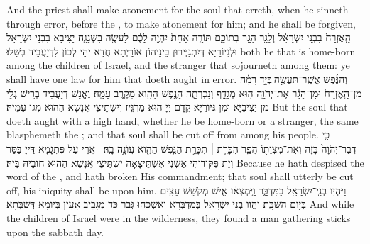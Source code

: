 {And the priest shall make atonement for the soul that erreth, when he sinneth through error, before the \lord, to make atonement for him; and he shall be forgiven,}{}
{הָֽאֶזְרָח֙ בִּבְנֵ֣י יִשְׂרָאֵ֔ל וְלַגֵּ֖ר הַגָּ֣ר בְּתוֹכָ֑ם תּוֹרָ֤ה אַחַת֙ יִהְיֶ֣ה לָכֶ֔ם לָעֹשֶׂ֖ה בִּשְׁגָגָֽה׃}
{יַצִּיבָא בִּבְנֵי יִשְׂרָאֵל וּלְגִיּוֹרַיָּא דְּיִתְגַּיְּירוּן בֵּינֵיהוֹן אוֹרָיְתָא חֲדָא יְהֵי לְכוֹן לִדְיַעֲבֵיד בְּשָׁלוּ׃}
{both he that is home-born among the children of Israel, and the stranger that sojourneth among them: ye shall have one law for him that doeth aught in error.}{}
{וְהַנֶּ֜פֶשׁ אֲשֶֽׁר־תַּעֲשֶׂ֣ה \legarmeh  בְּיָ֣ד רָמָ֗ה מִן־הָֽאֶזְרָח֙ וּמִן־הַגֵּ֔ר אֶת־יְהֹוָ֖ה ה֣וּא מְגַדֵּ֑ף וְנִכְרְתָ֛ה הַנֶּ֥פֶשׁ הַהִ֖וא מִקֶּ֥רֶב עַמָּֽהּ׃
}
{וֶאֱנָשׁ דְּיַעֲבֵיד בְּרֵישׁ גְּלֵי מִן יַצִּיבַיָּא וּמִן גִּיּוֹרַיָּא קֳדָם יְיָ הוּא מַרְגֵּיז וְיִשְׁתֵּיצֵי אֲנָשָׁא הַהוּא מִגּוֹ עַמֵּיהּ׃}
{But the soul that doeth aught with a high hand, whether he be home-born or a stranger, the same blasphemeth the \lord; and that soul shall be cut off from among his people.}{}
{כִּ֤י דְבַר־יְהֹוָה֙ בָּזָ֔ה וְאֶת־מִצְוָת֖וֹ הֵפַ֑ר הִכָּרֵ֧ת \small ׀\normalsize  תִּכָּרֵ֛ת הַנֶּ֥פֶשׁ הַהִ֖וא עֲוֺנָ֥ה בָֽהּ׃ \petucha 
{}}
{אֲרֵי עַל פִּתְגָמָא דַּייָ בַּסַּר וְיָת פִּקּוֹדוֹהִי אַשְׁנִי אִשְׁתֵּיצָאָה יִשְׁתֵּיצֵי אֲנָשָׁא הַהוּא חוֹבֵיהּ בֵּיהּ׃}
{Because he hath despised the word of the \lord, and hath broken His commandment; that soul shall utterly be cut off, his iniquity shall be upon him.}{}
{וַיִּהְי֥וּ בְנֵֽי־יִשְׂרָאֵ֖ל בַּמִּדְבָּ֑ר וַֽיִּמְצְא֗וּ אִ֛ישׁ מְקֹשֵׁ֥שׁ עֵצִ֖ים בְּי֥וֹם הַשַּׁבָּֽת׃
}
{וַהֲווֹ בְנֵי יִשְׂרָאֵל בְּמַדְבְּרָא וְאַשְׁכַּחוּ גְּבַר כַּד מְגָבֵיב אָעִין בְּיוֹמָא דְּשַׁבְּתָא׃}
{And while the children of Israel were in the wilderness, they found a man gathering sticks upon the sabbath day.}{}
